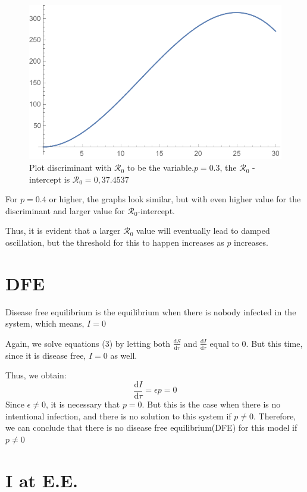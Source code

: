 \documentclass[12pt]{article}
\newcommand\dbyd[2]{\frac{\mathrm d{#1}}{\mathrm d{#2}}}
\newcommand{\R}{\mathcal{R}}
\begin{document}
\begin{figure}[H]
  \caption{Plot discriminant with $\mathcal{R}_0$ to be the variable.$p=0.3$, the $\mathcal{R}_0$ -intercept is $\mathcal{R}_0 = 0, 37.4537$}
  \centering
  \includegraphics[width=1.1\textwidth]{Figures/Plot_R_0_p_0_3.pdf}
\end{figure}

For $p=0.4$ or higher, the graphs look similar, but with even higher value for the discriminant and larger value for $\R_0$-intercept.

Thus, it is evident that a larger $\R_0$ value will eventually lead to damped oscillation, but the threshold for this to happen increases as $p$ increases.

\section{DFE}

Disease free equilibrium is the equilibrium when there is nobody infected in the system, which means, $I=0$

Again, we solve equations (3) by letting both $\dbyd{S}{\tau}$ and $\dbyd{I}{\tau}$ equal to 0. But this time, since it is disease free, $I=0$ as well.

Thus, we obtain:
\begin{equation}
\dbyd{I}{\tau}=\epsilon p=0
\end{equation}
Since $\epsilon\neq0$, it is necessary that $p=0$. But this is the case when there is no intentional infection, and there is no solution to this system if $p\neq0$. Therefore, we can conclude that there is no disease free equilibrium(DFE) for this model if $p\neq0$

\section{I at E.E.}
\end{document}
